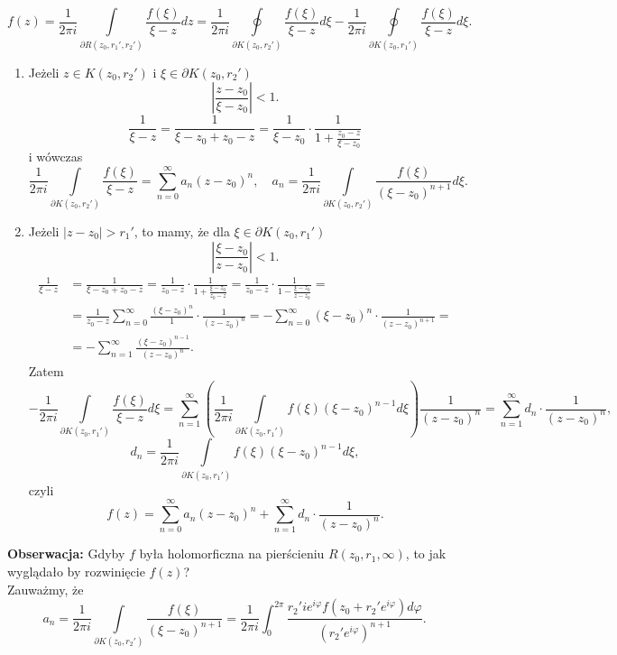 \documentclass[../main.tex]{subfiles}
\begin{document}
    \[
        f(z) = \frac{1}{2\pi i}\int\limits_{\partial R(z_0,r_1',r_2')} \frac{f(\xi)}{\xi - z}dz = \frac{1}{2\pi i}\oint\limits_{\partial K(z_0,r_2')}\frac{f(\xi)}{\xi - z}d\xi - \frac{1}{2\pi i}\oint\limits_{\partial K(z_0,r_1')}\frac{f(\xi)}{\xi-z}d\xi
    .\]
\begin{enumerate}
    \item Jeżeli $z\in K(z_0,r_2')$ i $\xi\in\partial K(z_0,r_2')$
\[
    \left| \frac{z-z_0}{\xi-z_0} \right| < 1
.\]
\[
    \frac{1}{\xi - z} = \frac{1}{\xi - z_0 + z_0 - z} = \frac{1}{\xi - z_0}\cdot \frac{1}{1+ \frac{z_0-z}{\xi - z_0}}
\]
i wówczas
\[
    \frac{1}{2\pi i}\int\limits_{\partial K(z_0, r_2')}\frac{f(\xi)}{\xi - z} = \sum_{n=0}^{\infty} a_n (z-z_0)^n,\quad a_n = \frac{1}{2 \pi i}\int\limits_{\partial K(z_0,r_2')}\frac{f(\xi)}{(\xi - z_0)^{n+1}}d\xi
.\]
    \item Jeżeli $|z-z_0| > r_1'$, to mamy, że dla $\xi\in\partial K(z_0,r_1')$
        \[
            \left| \frac{\xi - z_0}{z-z_0} \right| < 1
        .\]
    \begin{align*}
        \frac{1}{\xi - z} &= \frac{1}{\xi - z_0 + z_0 - z} = \frac{1}{z_0 - z} \cdot \frac{1}{1 + \frac{\xi - z_0}{z_0 - z}} = \frac{1}{z_0 - z}\cdot \frac{1}{1 - \frac{\xi - z_0}{z - z_0}} =\\
        &= \frac{1}{z_0 - z}\sum_{n=0}^{\infty} \frac{(\xi - z_0)^n}{1} \cdot \frac{1}{(z-z_0)^n} = -\sum_{n=0}^{\infty} (\xi - z_0)^n \cdot \frac{1}{(z-z_0)^{n+1}} =\\
        &= -\sum_{n=1}^{\infty} \frac{(\xi - z_0)^{n-1}}{(z-z_0)^n}
    .\end{align*}
Zatem
\[
    -\frac{1}{2\pi i}\int\limits_{\partial K(z_0,r_1')} \frac{f(\xi)}{\xi - z}d\xi = \sum_{n=1}^{\infty} \left( \frac{1}{2\pi i }\int\limits_{\partial K(z_0,r_1')}f(\xi) (\xi - z_0)^{n-1}d\xi \right) \frac{1}{(z-z_0)^n} = \sum_{n=1}^{\infty} d_n \cdot \frac{1}{(z-z_0)^n}
,\]
\[
    d_n = \frac{1}{2\pi i}\int\limits_{\partial K(z_0,r_1')}f(\xi)(\xi - z_0)^{n-1}d\xi
,\]
czyli
\[
    f(z) = \sum_{n=0}^{\infty} a_n (z-z_0)^n + \sum_{n=1}^{\infty} d_n \cdot \frac{1}{(z-z_0)^n}
.\]
\end{enumerate}
\textbf{Obserwacja:} Gdyby $f$ była holomorficzna na pierścieniu $R(z_0,r_1,\infty)$, to jak wyglądało by rozwinięcie $f(z)$?\\
Zauważmy, że \[
    a_n = \frac{1}{2\pi i}\int\limits_{\partial K(z_0,r_2')}\frac{f(\xi)}{(\xi - z_0)^{n+1}} = \frac{1}{2\pi i}\int_0^{2\pi}\frac{r_2'ie^{i\varphi}f(z_0+r_2'e^{i\varphi})d\varphi}{(r_2'e^{i\varphi})^{n+1}}
.\]
\end{document}
